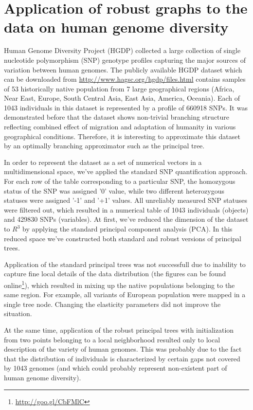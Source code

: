 \documentclass[graybox]{archivesofdatascience}
\begin{document}
\section{Application of robust graphs to the data on human genome diversity}

Human Genome Diversity Project (HGDP) collected a large collection of single nucleotide polymorphism (SNP) genotype profiles capturing the major sources of variation between human genomes. The publicly available HGDP dataset which can be downloaded from \url{http://www.hagsc.org/hgdp/files.html} contains samples of 53 historically native population from 7 large geographical regions (Africa, Near East, Europe, South Central Asia, East Asia, America, Oceania). Each of 1043 individuals in this dataset is represented by a profile of 660918 SNPs. It was demonstrated before that the dataset shows non-trivial branching structure reflecting combined effect of migration and adaptation of humanity in various geographical conditions\citep{Elhaik2014}. Therefore, it is interesting to approximate this dataset by an optimally branching approximator such as the principal tree.

In order to represent the dataset as a set of numerical vectors in a multidimensional space, we've applied the standard SNP quantification approach. For each row of the table corresponding to a particular SNP, the homozygous status of the SNP was assigned '0' value, while two different heterozygous statuses were assigned '-1' and '+1' values. All unreliably measured SNP statuses were filtered out, which resulted in a numerical table of 1043 individuals (objects) and 429830 SNPs (variables). At first, we've reduced the dimension of the dataset to $R^3$ by applying the standard principal component analysis (PCA). In this reduced space we've constructed both standard and robust versions of principal trees.

Application of the standard principal trees was not successfull due to inability to capture fine local details of the data distribution (the figures can be found online\footnote{\url{http://goo.gl/CbFMlC}}), which resulted in mixing up the native populations belonging to the same region. For example, all variants of European population were mapped in a single tree node. Changing the elasticity parameters did not improve the situation.

At the same time, application of the robust principal trees with initialization from two points belonging to a local neighborhood resulted only to local description of the variety of human genomes. This was probably due to the fact that the distribution of individuals is characterized by certain gaps not covered by 1043 genomes (and which could probably represent non-existent part of human genome diversity).
\end{document}
